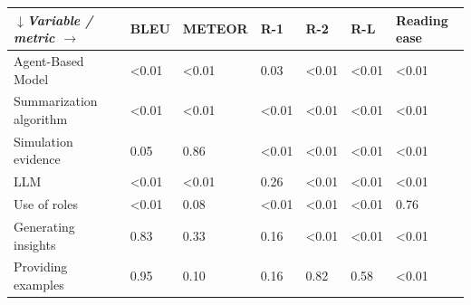 \begin{tabular}{|l|l|l|l|l|l|l|}
\hline
\textit{$\downarrow$Variable / metric $\rightarrow$} & BLEU & METEOR & R-1 & R-2 & R-L & Reading ease \\
 \hline
 Agent-Based Model & \textless{}0.01 & \textless{}0.01 & 0.03 & \textless{}0.01 & \textless{}0.01 & \textless{}0.01 \\
 \hline
 Summarization algorithm & \textless{}0.01 & \textless{}0.01 & \textless{}0.01 & \textless{}0.01 & \textless{}0.01 & \textless{}0.01 \\
 \hline
 Simulation evidence & 0.05 & 0.86 & \textless{}0.01 & \textless{}0.01 & \textless{}0.01 & \textless{}0.01 \\
 \hline
 LLM & \textless{}0.01 & \textless{}0.01 & 0.26 & \textless{}0.01 & \textless{}0.01 & \textless{}0.01 \\
 \hline
 Use of roles & \textless{}0.01 & 0.08 & \textless{}0.01 & \textless{}0.01 & \textless{}0.01 & 0.76 \\
 \hline
 Generating insights & 0.83 & 0.33 & 0.16 & \textless{}0.01 & \textless{}0.01 & \textless{}0.01 \\
 \hline
 Providing examples & 0.95 & 0.10 & 0.16 & 0.82 & 0.58 & \textless{}0.01 \\
\hline
\end{tabular}
